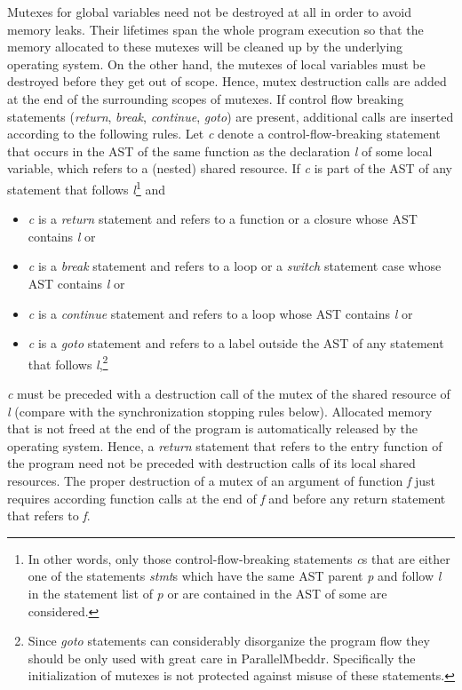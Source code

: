 Mutexes for global variables need not be destroyed at all in order to avoid memory leaks. Their lifetimes span the whole program execution so that the  memory allocated to these mutexes will be cleaned up by the underlying operating system. On the other hand, the mutexes of local variables must be destroyed before they get out of scope. Hence, mutex destruction calls are added at the end of the surrounding scopes of mutexes. If control flow breaking statements (\textit{return}, \textit{break}, \textit{continue}, \textit{goto}) are present, additional calls are inserted according to the following rules. Let \textit{c} denote a control-flow-breaking statement that occurs in the AST of the same function as the declaration \textit{l} of some local variable, which refers to a (nested) shared resource. If \textit{c} is part of the AST of any statement that follows \textit{l}\footnote{In other words, only those control-flow-breaking statements \textit{c}s that are either one of the statements \textit{stmt}s which have the same AST parent \textit{p} and follow \textit{l} in the statement list of \textit{p} or are contained in the AST of some  are considered.} and
\begin{itemize}
\item \textit{c} is a \textit{return} statement and refers to a function or a closure whose AST contains \textit{l} or
\item \textit{c} is a \textit{break} statement and refers to a loop or a \textit{switch} statement case whose AST contains \textit{l} or
\item \textit{c} is a \textit{continue} statement and refers to a loop whose AST contains \textit{l} or
\item \textit{c} is a \textit{goto} statement and refers to a label outside the AST of any statement that follows \textit{l},\footnote{Since \textit{goto} statements can considerably disorganize the program flow they should be only used with great care in ParallelMbeddr. Specifically the initialization of mutexes is not protected against misuse of these statements.}
\end{itemize}
\textit{c} must be preceded with a destruction call of the mutex of the shared resource of \textit{l} (compare with the synchronization stopping rules below). Allocated memory that is not freed at the end of the program is automatically released by the operating system. Hence, a \textit{return} statement that refers to the entry function of the program need not be preceded with destruction calls of its local shared resources. The proper destruction of a mutex of an argument of function \textit{f} just requires according function calls at the end of \textit{f} and before any return statement that refers to \textit{f}. 

